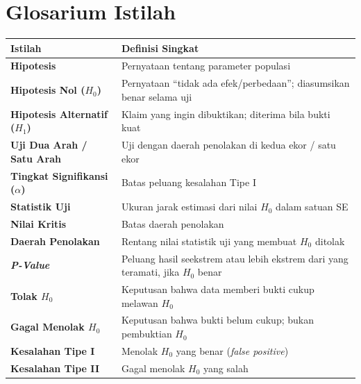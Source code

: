 \documentclass[
  indonesian,
  letterpaper,
]{book}
\newcounter{none} %
\begin{document}

\chapter{Glosarium Istilah}\label{glosarium-istilah-1}

{\def\LTcaptype{none} %
\begin{longtable}[]{@{}
  >{\raggedright\arraybackslash}p{}
  >{\raggedright\arraybackslash}p{}@{}}
\toprule\noalign{}
\begin{minipage}[b]{\linewidth}\raggedright
Istilah
\end{minipage} & \begin{minipage}[b]{\linewidth}\raggedright
Definisi Singkat
\end{minipage} \\
\midrule\noalign{}
\endhead
\bottomrule\noalign{}
\endlastfoot
\textbf{Hipotesis} & Pernyataan tentang parameter populasi \\
\textbf{Hipotesis Nol (\(H_0\))} & Pernyataan ``tidak ada
efek/perbedaan''; diasumsikan benar selama uji \\
\textbf{Hipotesis Alternatif (\(H_1\))} & Klaim yang ingin dibuktikan;
diterima bila bukti kuat \\
\textbf{Uji Dua Arah / Satu Arah} & Uji dengan daerah penolakan di kedua
ekor / satu ekor \\
\textbf{Tingkat Signifikansi (\(\alpha\))} & Batas peluang kesalahan
Tipe I \\
\textbf{Statistik Uji} & Ukuran jarak estimasi dari nilai \(H_0\) dalam
satuan SE \\
\textbf{Nilai Kritis} & Batas daerah penolakan \\
\textbf{Daerah Penolakan} & Rentang nilai statistik uji yang membuat
\(H_0\) ditolak \\
\textbf{\emph{P-Value}} & Peluang hasil seekstrem atau lebih ekstrem
dari yang teramati, jika \(H_0\) benar \\
\textbf{Tolak \(H_0\)} & Keputusan bahwa data memberi bukti cukup
melawan \(H_0\) \\
\textbf{Gagal Menolak \(H_0\)} & Keputusan bahwa bukti belum cukup;
bukan pembuktian \(H_0\) \\
\textbf{Kesalahan Tipe I} & Menolak \(H_0\) yang benar (\emph{false
positive}) \\
\textbf{Kesalahan Tipe II} & Gagal menolak \(H_0\) yang salah

\end{longtable}}
\end{document}
